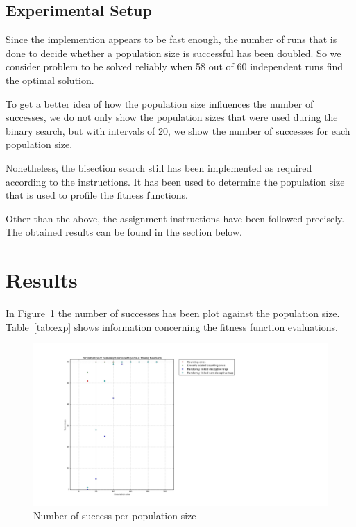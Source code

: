 \documentclass[12pt]{article}
\theoremstyle{definition}
\begin{document}
\subsection*{Experimental Setup}
Since the implemention appears to be fast enough, the number of runs that is done to decide whether a population size is successful has been doubled.
So we consider problem to be solved reliably when 58 out of 60 independent runs find the optimal solution.

To get a better idea of how the population size influences the number of successes, we do not only show the population sizes that were used during the binary search, but with intervals of 20, we show the number of successes for each population size.

Nonetheless, the bisection search still has been implemented as required according to the instructions.
It has been used to determine the population size that is used to profile the fitness functions.

Other than the above, the assignment instructions have been followed precisely.
The obtained results can be found in the section below.


\section{Results}
\label{ssec:exp}
In Figure~\ref{fig:exp} the number of successes has been plot against the population size.
Table~\ref{tab:exp} shows information concerning the fitness function evaluations.

\begin{figure}[!htb]
    \centering
    \includegraphics[totalheight=0.7\textheight]{images/exp.png}
    \caption{Number of success per population size}
\label{fig:exp}
\end{figure}
\end{document}
